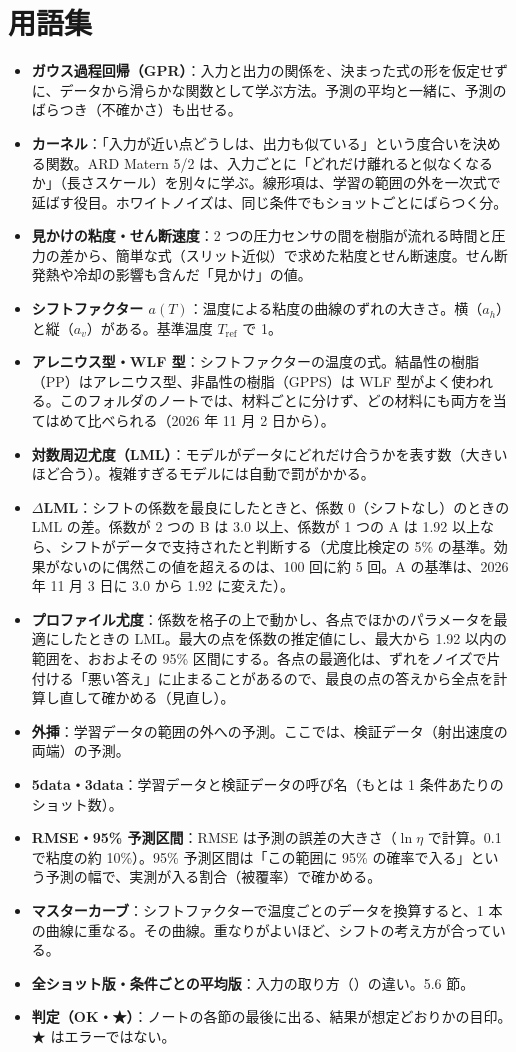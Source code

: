 \documentclass[paper=a4paper,fontsize=10.5pt,line_length=44zw,number_of_lines=38]{jlreq}
\newcommand{\file}[1]{\texttt{\detokenize{#1}}}
\newenvironment{termlist}{\begin{itemize}[label=・,leftmargin=1\zw,labelwidth=1\zw,labelsep=0pt,itemsep=0.4ex,topsep=0.6ex,parsep=0pt]}{\end{itemize}}
\newcommand{\term}[1]{\item \textbf{#1}：}
\begin{document}
\section{用語集}
\begin{termlist}
\term{ガウス過程回帰（GPR）}入力と出力の関係を、決まった式の形を仮定せずに、データから滑らかな関数として学ぶ方法。予測の平均と一緒に、予測のばらつき（不確かさ）も出せる。
\term{カーネル}「入力が近い点どうしは、出力も似ている」という度合いを決める関数。ARD Matern 5/2 は、入力ごとに「どれだけ離れると似なくなるか」（長さスケール）を別々に学ぶ。線形項は、学習の範囲の外を一次式で延ばす役目。ホワイトノイズは、同じ条件でもショットごとにばらつく分。
\term{見かけの粘度・せん断速度}2 つの圧力センサの間を樹脂が流れる時間と圧力の差から、簡単な式（スリット近似）で求めた粘度とせん断速度。せん断発熱や冷却の影響も含んだ「見かけ」の値。
\term{シフトファクター $a(T)$}温度による粘度の曲線のずれの大きさ。横（$a_h$）と縦（$a_v$）がある。基準温度 $T_{\mathrm{ref}}$ で 1。
\term{アレニウス型・WLF 型}シフトファクターの温度の式。結晶性の樹脂（PP）はアレニウス型、非晶性の樹脂（GPPS）は WLF 型がよく使われる。このフォルダのノートでは、材料ごとに分けず、どの材料にも両方を当てはめて比べられる（2026 年 11 月 2 日から）。
\term{対数周辺尤度（LML）}モデルがデータにどれだけ合うかを表す数（大きいほど合う）。複雑すぎるモデルには自動で罰がかかる。
\term{$\Delta$LML}シフトの係数を最良にしたときと、係数 0（シフトなし）のときの LML の差。係数が 2 つの B は 3.0 以上、係数が 1 つの A は 1.92 以上なら、シフトがデータで支持されたと判断する（尤度比検定の 5\% の基準。効果がないのに偶然この値を超えるのは、100 回に約 5 回。A の基準は、2026 年 11 月 3 日に 3.0 から 1.92 に変えた）。
\term{プロファイル尤度}係数を格子の上で動かし、各点でほかのパラメータを最適にしたときの LML。最大の点を係数の推定値にし、最大から 1.92 以内の範囲を、おおよその 95\% 区間にする。各点の最適化は、ずれをノイズで片付ける「悪い答え」に止まることがあるので、最良の点の答えから全点を計算し直して確かめる（見直し）。
\term{外挿}学習データの範囲の外への予測。ここでは、検証データ（射出速度の両端）の予測。
\term{5data・3data}学習データと検証データの呼び名（もとは 1 条件あたりのショット数）。
\term{RMSE・95\% 予測区間}RMSE は予測の誤差の大きさ（$\ln\eta$ で計算。0.1 で粘度の約 10\%）。95\% 予測区間は「この範囲に 95\% の確率で入る」という予測の幅で、実測が入る割合（被覆率）で確かめる。
\term{マスターカーブ}シフトファクターで温度ごとのデータを換算すると、1 本の曲線に重なる。その曲線。重なりがよいほど、シフトの考え方が合っている。
\term{全ショット版・条件ごとの平均版}入力の取り方（\file{INPUT_MODE}）の違い。5.6 節。
\term{判定（OK・★）}ノートの各節の最後に出る、結果が想定どおりかの目印。★ はエラーではない。
\end{termlist}
\end{document}
